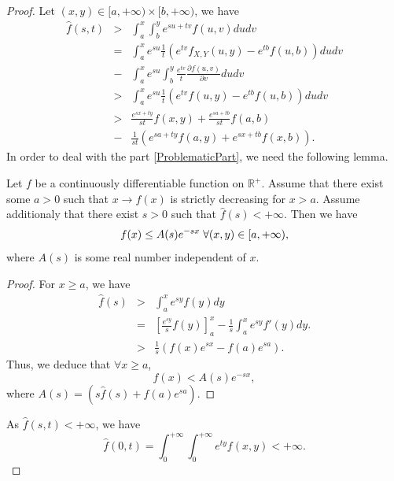 \begin{proof}
Let $(x,y)\in[a,+\infty) \times [b,+\infty)$, we have 
\begin{eqnarray}
\widehat{f}(s,t)&>&\int_{a}^{x}\int_{b}^{y}e^{su+tv}f(u,v)dudv\nonumber\\
&=&\int_{a}^{x}e^{su} \frac{1}{t}(e^{tv}f_{X,Y}(u,y)-e^{tb}f(u,b))dudv\nonumber\\
&-&\int_{a}^{x}e^{su}\int_{b}^{y}\frac{e^{tv}}{t}\frac{\partial f(u,v)}{\partial v}dudv\nonumber\\
&>&\int_{a}^{x}e^{su} \frac{1}{t}(e^{tv}f(u,y)-e^{tb}f(u,b))dudv\nonumber\\
&>&\frac{e^{sx+ty}}{st}f(x,y)+\frac{e^{sa+tb}}{st}f(a,b)\nonumber\\
&-&\frac{1}{st}\left(e^{sa+ty}f(a,y)+e^{sx+tb}f(x,b)\right)\label{ProblematicPart}.
\end{eqnarray}
In order to deal with the part \eqref{ProblematicPart}, we need the following lemma.
\begin{Lemm}\label{TechnicalLemma}
Let $f$ be a continuously differentiable function on $\mathbb{R}^{+}$. Assume that there exist some $a>0$ such that $x\rightarrow f(x)$ is strictly decreasing for $x>a$. Assume additionaly that there exist $s>0$ such that $\widehat{f}(s)<+\infty$. Then we have
\begin{equation}
f(x)\leq A(s)e^{-sx} \hspace{0.1cm} \forall (x,y)\in[a,+\infty),
\end{equation} 
where $A(s)$ is some real number independent of $x$. 
\end{Lemm}
\begin{proof}
For $x\geq a$, we have 
\begin{eqnarray}
\widehat{f}(s)&>&\int_{a}^{x}e^{sy}f(y)dy \nonumber\\
&=& \left[\frac{e^{sy}}{s}f(y)\right]_{a}^{x}-\frac{1}{s}\int_{a}^{x}e^{sy}f'(y)dy.\\
&>& \frac{1}{s}\left(f(x)e^{sx}-f(a)e^{sa}\right).\label{Inequality1}
\end{eqnarray}
Thus, we deduce that $\forall x\geq a$,
\begin{equation*}
f(x)<A(s)e^{-sx},
\end{equation*}
where $A(s)=\left(s\widehat{f}(s)+f(a)e^{sa}\right)$.
\end{proof}
As $\widehat{f}(s,t)<+\infty$, we have
\begin{equation}
\widehat{f}(0,t)=\int_{0}^{+\infty}\int_{0}^{+\infty}e^{ty}f(x,y)<+\infty.
\end{equation}

\end{proof}
